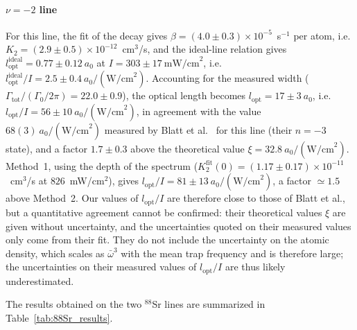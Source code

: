 \paragraph{$\nu=-2$ line}
For this line, the fit of the decay gives
$\beta=(4.0\pm0.3)\times10^{-5}$~s$^{-1}$ per atom, i.e.
$K_2=(2.9\pm0.5)\times10^{-12}$~cm$^3$/s, and the ideal-line relation gives
$l_{\text{opt}}^{\text{ideal}} = 0.77\pm0.12~a_0$ at $I = 303\pm17~\text{mW/cm}^2$, i.e.
$l_{\text{opt}}^{\text{ideal}}/I = 2.5\pm0.4~a_0/(\text{W/cm}^2)$. Accounting for the
measured width ($\Gamma_{\text{tot}}/(\Gamma_0/2\pi) = 22.0\pm0.9$), the optical length becomes
$l_{\text{opt}} = 17\pm3~a_0$, i.e. $l_{\text{opt}}/I = 56\pm10~a_0/(\text{W/cm}^2)$, in
agreement with the value $68(3)~a_0/(\text{W/cm}^2)$ measured by Blatt et
al.~\cite{blatt_systematic_2011} for this line (their $n=-3$ state), and a factor
$1.7\pm0.3$ above the theoretical value $\xi = 32.8~a_0/(\text{W/cm}^2)$. Method~1, using the
depth of the spectrum ($K_2^{\text{fit}}(0)=(1.17\pm0.17)\times10^{-11}$~cm$^3$/s at $826$~mW/cm$^2$),
gives $l_{\text{opt}}/I=81\pm13~a_0/(\text{W/cm}^2)$, a factor $\simeq1.5$ above Method~2.
Our values of $l_{\text{opt}}/I$ are therefore close to those of Blatt et al., but a
quantitative agreement cannot be confirmed: their theoretical values $\xi$ are given without
uncertainty, and the uncertainties quoted on their measured values only come from their fit.
They do not include the uncertainty on the atomic density, which scales as $\bar\omega^3$
with the mean trap frequency and is therefore large; the uncertainties on their measured
values of $l_{\text{opt}}/I$ are thus likely underestimated.



The results obtained on the two $^{88}$Sr lines are summarized in Table~\ref{tab:88Sr_results}.

